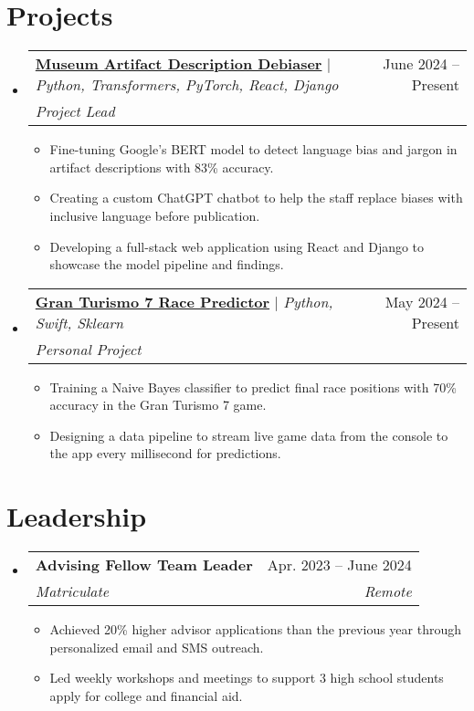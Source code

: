 \documentclass[letterpaper,11pt]{article}
\makeatletter
\newcommand{\resumeItem}[1]{
  \item\small{
    {#1 \vspace{-2pt}}
  }
}
\newcommand{\resumeSubheading}[4]{
  \vspace{-2pt}\item
    \begin{tabular*}{0.97\textwidth}[t]{l@{\extracolsep{\fill}}r}
      \textbf{#1} & #2 \\
      \textit{\small#3} & \textit{\small #4} \\
    \end{tabular*}\vspace{-7pt}
}
\newcommand{\myResumeProjectHeading}[3]{
	\item
    \begin{tabular*}{0.97\textwidth}{l@{\extracolsep{\fill}}r}
      \small#1 & #2 \\
      \textit{\small#3} \\
    \end{tabular*}\vspace{-7pt}
}
\newcommand{\resumeSubHeadingListStart}{\begin{itemize}[leftmargin=0.15in, label={}]}
\newcommand{\resumeSubHeadingListEnd}{\end{itemize}}
\newcommand{\resumeItemListStart}{\begin{itemize}}
\newcommand{\resumeItemListEnd}{\end{itemize}\vspace{-5pt}}
\makeatother
\begin{document}
\section{Projects}
    \resumeSubHeadingListStart
	\myResumeProjectHeading
	{\href{https://github.com/Student9676/carlos-artifact-tagging-bias}{\textbf{Museum Artifact Description Debiaser}} $|$ \emph{Python, Transformers, PyTorch, React, Django}}{June 2024 -- Present}
		  {Project Lead}
          \resumeItemListStart
            \resumeItem{Fine-tuning Google's BERT model to detect language bias and jargon in artifact descriptions with 83\% accuracy.}
            \resumeItem{Creating a custom ChatGPT chatbot to help the staff replace biases with inclusive language before publication.}
			\resumeItem{Developing a full-stack web application using React and Django to showcase the model pipeline and findings.}
          \resumeItemListEnd

      \myResumeProjectHeading
	{\href{https://github.com/Student9676/gt7predictor}{\textbf{Gran Turismo 7 Race Predictor}} $|$ \emph{Python, Swift, Sklearn}}{May 2024 -- Present}
          {Personal Project}
		  \resumeItemListStart
		  \resumeItem{Training a Naive Bayes classifier to predict final race positions with 70\% accuracy in the Gran Turismo 7 game.}
		  \resumeItem{Designing a data pipeline to stream live game data from the console to the app every millisecond for predictions.}
          \resumeItemListEnd
    \resumeSubHeadingListEnd

    


\section{Leadership}
  \resumeSubHeadingListStart
    \resumeSubheading
      {Advising Fellow Team Leader}{Apr. 2023 -- June 2024}
      {Matriculate}{Remote}
      \resumeItemListStart
        \resumeItem{Achieved 20\% higher advisor applications than the previous year through personalized email and SMS outreach.}
        \resumeItem{Led weekly workshops and meetings to support 3 high school students apply for college and financial aid.}
      \resumeItemListEnd
  \resumeSubHeadingListEnd
\end{document}
